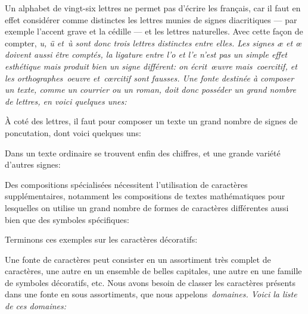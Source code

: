 Un alphabet de vingt-six lettres ne permet pas d'écrire les français,
car il faut en effet considérer comme distinctes les lettres munies de
signes diacritiques --- par exemple l'accent grave et la cédille ---
et les lettres naturelles. Avec cette façon de compter, \em{u, ü
\em{et}~ù} sont donc trois lettres distinctes entre elles. Les signes
\em{æ} et \em{œ} doivent aussi être comptés, la ligature entre
l'\em{o} et l'\em{e} n'est pas un simple effet esthétique mais produit
bien un signe différent: on écrit~\em{œuvre} mais~\em{coercitif}, et
les orthographes~\em{oeuvre} et~\em{cœrcitif} sont fausses. Une fonte
destinée à composer un texte, comme un courrier ou un roman, doit donc
posséder un grand nombre de lettres, en voici quelques unes:


À coté des lettres, il faut pour composer un texte un grand nombre de
signes de poncutation, dont voici quelques uns:


Dans un texte ordinaire se trouvent enfin des chiffres, et une grande
variété d'autres signes:


Des compositions spécialisées nécessitent l'utilisation de caractères
supplémentaires, notamment les compositions de textes mathématiques
pour lesquelles on utilise un grand nombre de formes de caractères
différentes aussi bien que des symboles spécifiques:

\sampleline{%
\fontsample\rm{$\int$}\hfil
\fontsample\rm{$\star$}\hfil
\fontsample\rm{$\otimes$}\hfil%
\fontsample\rm{$\coprod$}
}

Terminons ces exemples sur les caractères décoratifs:


Une fonte de caractères peut consister en un assortiment très complet
de caractères, une autre en un ensemble de belles capitales, une autre
en une famille de symboles décoratifs, etc. Nous avons besoin de
classer les caractères présents dans une fonte en sous assortiments,
que nous appelons~\em{domaines}. Voici la liste de ces domaines:

